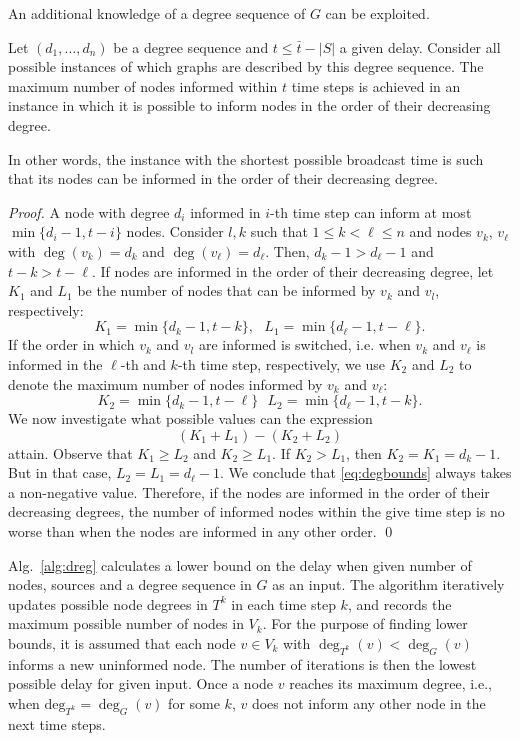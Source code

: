 An additional knowledge of a degree sequence of $G$ can be exploited. 
\begin{lemma}
\label{lemma:degorder}
Let $(d_1,\dots,d_n)$ be a degree sequence and $t\leq \bar{t}-|S|$ a given delay.
Consider all possible instances of which graphs are described by this degree sequence.
The maximum number of nodes informed within $t$ time steps is achieved in an instance in which it is possible to inform  nodes in the order of their decreasing degree.

In other words, the instance with the shortest possible broadcast time is such that its nodes can be informed in the order of their decreasing degree.

\end{lemma}
\begin{proof}
A node with degree $d_i$ informed in $i$-th time step can inform at most $\min\{d_i-1,t-i\}$ nodes.
Consider $l,k$ such that $1\leq k < \ell\leq n$ and nodes $v_k$, $v_\ell$ with $\deg(v_k)=d_k$ and $\deg(v_\ell)=d_\ell$.
Then, $d_k-1>d_\ell-1$ and $t-k > t-\ell$.
If nodes are informed in the order of their decreasing degree, let $K_1$ and $L_1$ be the number of nodes that can be informed by $v_k$ and $v_l$, respectively:
$$
K_1=\min\{d_k-1,t-k\}, ~~~ L_1=\min\{d_\ell-1,t-\ell\}.
$$
If the order in which $v_k$ and $v_l$ are informed is switched, i.e. when $v_k$ and $v_\ell$ is informed in the $\ell$-th and $k$-th time step, respectively, 
we use $K_2$ and $L_2$ to denote the maximum number of nodes informed by $v_k$ and $v_\ell$:
$$
K_2=\min\{d_k-1,t-\ell\} ~~~ L_2=\min\{d_\ell-1,t-k\}.
$$
We now investigate what possible values can the expression 
\begin{equation}
\label{eq:degbounds}
(K_1+L_1)-(K_2+L_2)
\end{equation}
attain.
Observe that $K_1\geq L_2$ and $K_2\geq L_1$. 
If $K_2>L_1$, then $K_2=K_1=d_k-1$.
But in that case, $L_2=L_1=d_\ell-1$. 
We conclude that \eqref{eq:degbounds} always takes a non-negative value.
Therefore, if the nodes are informed in the order of their decreasing degrees,
the number of informed nodes within the give time step is no worse than when the nodes are informed in any other order.
\qed
\end{proof}

Alg.~\ref{alg:dreg} calculates a lower bound on the delay when given number of nodes, sources and a degree sequence in $G$ as an input.
The algorithm iteratively updates possible node degrees in $T^k$ in each time step $k$, and records the maximum possible number of nodes in $V_k$.
For the purpose of finding lower bounds, it is assumed that each node $v\in V_k$ with $\deg_{T^k}(v)<\deg_G(v)$ informs a new uninformed node.
The number of iterations is then the lowest possible delay for given input.
Once a node $v$ reaches its maximum degree, i.e., when $\text{deg}_{T^k}=\deg_G(v)$ for some $k$, $v$ does not inform any other node in the next time steps.

